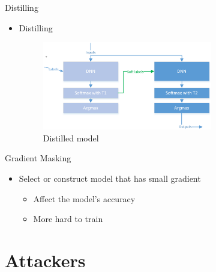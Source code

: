 \documentclass[
 size=12pt,
 paper=smartboard, %
 mode=present, %
 display=slides, %
style=tuliplab,
pauseslide,
fleqn,leqno]{powerdot}
\begin{document}
\begin{slide}{Distilling}
  \begin{itemize}
    \item Distilling \cite{RN49} \pause
    \begin{figure}[h]
      \centering
      \includegraphics[width=0.7\textwidth]{figures3/distilled.eps}
      \caption{Distilled model}
      \label{fig:distilled-model}
    \end{figure}
  \end{itemize}
\end{slide}

\begin{slide}{Gradient Masking}
  \begin{itemize}
    \item Select or construct model that has small gradient \pause
    \begin{itemize}
      \item Affect the model's accuracy
      \item More hard to train 
    \end{itemize}
  \end{itemize}
\end{slide}



\section{Attackers}
\end{document}
